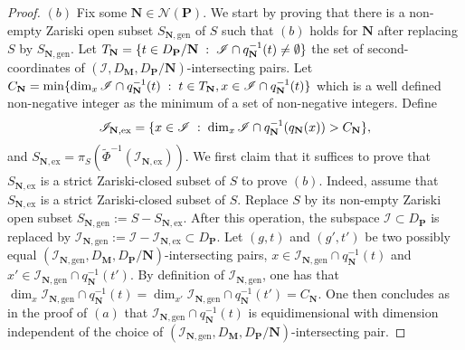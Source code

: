 \documentclass[10pt]{article}
\numberwithin{equation}{subsection}
\theoremstyle{plain}
\theoremstyle{definition}
\theoremstyle{remark}
\newcommand{\I}{\mathscr{I}}
\newcommand{\pp}{\mathbf P}
\newcommand{\M}{\mathbf M}
\newcommand{\NN}{\mathbf N}
\newcommand{\Np}{\mathcal{N}(\pp)}
\newcommand{\ex}{\mathrm{ex}}
\newcommand{\gen}{\mathrm{gen}}
\begin{document}
\begin{proof}
$(b)$ Fix some $\NN \in \Np$. We start by proving that there is a non-empty Zariski open subset $S_{\NN,\gen}$ of $S$ such that $(b)$ holds for $\NN$ after replacing $S$ by $S_{\NN,\gen}$. Let $T_\NN = \{t \in D_\pp/\NN \hspace{0.1cm} : \hspace{0.1cm} \I \cap q_\NN^{-1}(t) \neq \emptyset \}$ the set of second-coordinates of $(\I,D_\M, D_\pp/\NN)$-intersecting pairs. Let $C_\NN = \min \{\dim_x \I \cap q_\NN^{-1}(t) \hspace{0.1cm} : \hspace{0.1cm} t \in T_\NN, x \in \I \cap q_\NN^{-1}(t)\}$ which is a well defined non-negative integer as the minimum of a set of non-negative integers. Define
\[
\I_{\NN,\ex} = \{ x \in \I \hspace{0.1cm} : \hspace{0.1cm} \dim_x \I \cap q_\NN^{-1}(q_\NN(x)) > C_\NN\},
\]
and $S_{\NN,\ex} = \pi_S(\tilde{\Phi}^{-1}(\I_{\NN,\ex}))$. We first claim that it suffices to prove that $S_{\NN,\ex}$ is a strict Zariski-closed subset of $S$ to prove $(b)$. Indeed, assume that $S_{\NN,\ex}$ is a strict Zariski-closed subset of $S$. Replace $S$ by its non-empty Zariski open subset $S_{\NN,\gen} := S-S_{\NN,\ex}$. After this operation, the subspace $\I \subset D_\pp$ is replaced by $\I_{\NN,\gen} := \I-\I_{\NN,\ex} \subset D_\pp$. Let $(g,t)$ and $(g',t')$ be two possibly equal $(\I_{\NN,\gen},D_\M,D_\pp/\NN)$-intersecting pairs, $x \in \I_{\NN,\gen} \cap q_\NN^{-1}(t)$ and $x' \in \I_{\NN,\gen} \cap q_\NN^{-1}(t')$. By definition of $\I_{\NN,\gen}$, one has that $\dim_x \I_{\NN,\gen} \cap q_\NN^{-1}(t) = \dim_{x'} \I_{\NN,\gen} \cap q_\NN^{-1}(t') = C_\NN$. One then concludes as in the proof of $(a)$ that   $\I_{\NN,\gen} \cap q_\NN^{-1}(t)$ is equidimensional with dimension independent of the choice of $(\I_{\NN,\gen}, D_\M, D_\pp/\NN)$-intersecting pair.


\end{proof}
\end{document}
